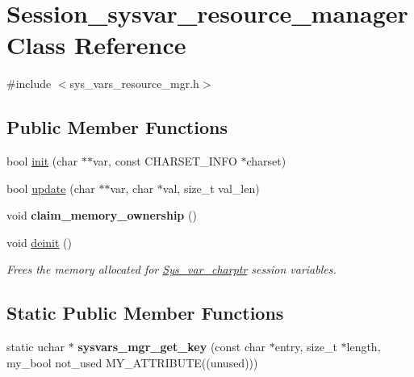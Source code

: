 \hypertarget{classSession__sysvar__resource__manager}{}\section{Session\+\_\+sysvar\+\_\+resource\+\_\+manager Class Reference}
\label{classSession__sysvar__resource__manager}


{\ttfamily \#include $<$sys\+\_\+vars\+\_\+resource\+\_\+mgr.\+h$>$}

\subsection*{Public Member Functions}
\begin{DoxyCompactItemize}
\item 
bool \mbox{\hyperlink{classSession__sysvar__resource__manager_ab8b24f45b62c94db75fc79ef34b5b309}{init}} (char $\ast$$\ast$var, const C\+H\+A\+R\+S\+E\+T\+\_\+\+I\+N\+FO $\ast$charset)
\item 
bool \mbox{\hyperlink{classSession__sysvar__resource__manager_a543b75dc636128ad9938298da3119adf}{update}} (char $\ast$$\ast$var, char $\ast$val, size\+\_\+t val\+\_\+len)
\item 
\mbox{\label{classSession__sysvar__resource__manager_ae99311da0b61b200064e4c3ecb09efd5}} 
void {\bfseries claim\+\_\+memory\+\_\+ownership} ()
\item 
void \mbox{\hyperlink{classSession__sysvar__resource__manager_a099e7961a4d1c193fac564efc0e3ecd4}{deinit}} ()
\begin{DoxyCompactList}\small\item\em Frees the memory allocated for \mbox{\hyperlink{classSys__var__charptr}{Sys\+\_\+var\+\_\+charptr}} session variables. \end{DoxyCompactList}\end{DoxyCompactItemize}
\subsection*{Static Public Member Functions}
\begin{DoxyCompactItemize}
\item 
\mbox{\label{classSession__sysvar__resource__manager_a6d947ade10d0100ac4727b5537fb433c}} 
static uchar $\ast$ {\bfseries sysvars\+\_\+mgr\+\_\+get\+\_\+key} (const char $\ast$entry, size\+\_\+t $\ast$length, my\+\_\+bool not\+\_\+used M\+Y\+\_\+\+A\+T\+T\+R\+I\+B\+U\+TE((unused)))
\end{DoxyCompactItemize}


